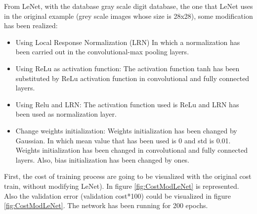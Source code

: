 
From LeNet, with the database gray scale digit database, the one that LeNet uses in the original example (grey scale images whose size is 28x28), some modification has been realized:\\

\begin{itemize}
\item{Using Local Response Normalization (LRN) In which a normalization has been carried out in the convolutional-max pooling layers.}
\item{Using ReLu as activation function:} The activation function tanh has been substituted by ReLu activation function in convolutional and fully connected layers.
\item{Using Relu and LRN}: The activation function used is ReLu and LRN has been used as  normalization layer.
\item{Change weights initialization}: Weights initialization has been changed by Gaussian. In which mean value that has been used is 0 and std is 0.01. Weights initialization has been changed in convolutional and fully connected layers. Also, bias initialization has been changed by ones.
\end{itemize}


First, the cost of training process are going to be visualized with the original cost train, without modifying LeNet). In figure \ref{fig:CostModLeNet} is represented. Also the validation error (validation cost*100) could be visualized in figure \ref{fig:CostModLeNet}. The network has been running for 200 epochs.\\

